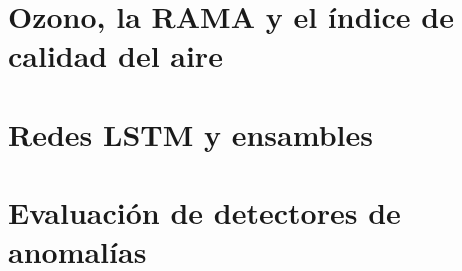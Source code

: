 \section{Ozono, la RAMA y el índice de calidad del aire}    %

\section{Redes LSTM y ensambles}                            %

\section{Evaluación de detectores de anomalías}             %

